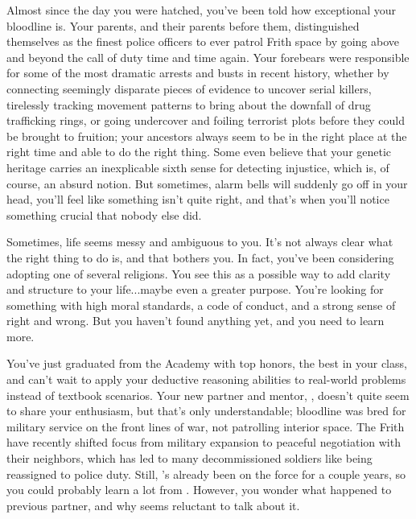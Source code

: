 \documentclass[char]{guildcamp4}
\begin{document}
\name{\cCgood{}}

Almost since the day you were hatched, you've been told how exceptional your bloodline is. Your parents, and their parents before them, distinguished themselves as the finest police officers to ever patrol Frith space by going above and beyond the call of duty time and time again. Your forebears were responsible for some of the most dramatic arrests and busts in recent history, whether by connecting seemingly disparate pieces of evidence to uncover serial killers, tirelessly tracking movement patterns to bring about the downfall of drug trafficking rings, or going undercover and foiling terrorist plots before they could be brought to fruition; your ancestors always seem to be in the right place at the right time and able to do the right thing. Some even believe that your genetic heritage carries an inexplicable sixth sense for detecting injustice, which is, of course, an absurd notion. But sometimes, alarm bells will suddenly go off in your head, you'll feel like something isn't quite right, and that's when you'll notice something crucial that nobody else did. 

Sometimes, life seems messy and ambiguous to you. It's not always clear what the right thing to do is, and that bothers you. In fact, you've been considering adopting one of several religions. You see this as a possible way to add clarity and structure to your life...maybe even a greater purpose. You're looking for something with high moral standards, a code of conduct, and a strong sense of right and wrong. But you haven't found anything yet, and you need to learn more.

You've just graduated from the Academy with top honors, the best in your class, and can't wait to apply your deductive reasoning abilities to real-world problems instead of textbook scenarios. Your new partner and mentor, \cCbad{}, doesn't quite seem to share your enthusiasm, but that's only understandable; \cCbad{\their} bloodline was bred for military service on the front lines of war, not patrolling interior space. The Frith have recently shifted focus from military expansion to peaceful negotiation with their neighbors, which has led to many decommissioned soldiers like \cCbad{} being reassigned to police duty. Still, \cCbad{\they}'s already been on the force for a couple years, so you could probably learn a lot from \cCbad{\them}. However, you wonder what happened to \cCbad{\their} previous partner, and why \cCbad{\they} seems reluctant to talk about it.
\end{document}
